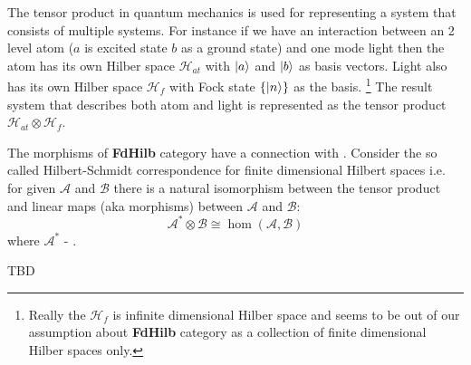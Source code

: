 The tensor product in quantum mechanics is used for
representing a system that consists of multiple systems. For instance
if we have an interaction between an 2 level atom ($a$ is excited
state $b$ as a ground state) and one mode light then the
atom has its own Hilber space $\mathcal{H}_{at}$ with $\ket{a}$ and
$\ket{b}$ as basis 
vectors.  Light also has its own Hilber space $\mathcal{H}_f$ with Fock state
$\{\ket{n}\}$ as the basis.
\footnote{
  Really the $\mathcal{H}_f$ is infinite dimensional Hilber space and
  seems to be out of our assumption about \textbf{FdHilb} category as
  a collection of finite dimensional Hilber spaces only.
}
The result system that describes both atom
and light is represented as the tensor product $\mathcal{H}_{at}
\otimes \mathcal{H}_f$.

The morphisms of \textbf{FdHilb} category have a connection with
. Consider the so called Hilbert-Schmidt
correspondence for finite dimensional Hilbert spaces i.e. for given
$\mathcal{A}$ and $\mathcal{B}$ there is a natural isomorphism between
the tensor product and linear maps (aka morphisms) between
$\mathcal{A}$ and $\mathcal{B}$:
\[
\mathcal{A}^\ast \otimes \mathcal{B} \cong \hom(\mathcal{A}, \mathcal{B})
\]
where $\mathcal{A}^\ast$ - .


TBD
